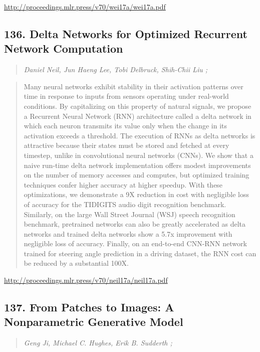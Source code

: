 \documentclass{article}
\begin{document}
\href{http://proceedings.mlr.press/v70/wei17a/wei17a.pdf}{http://proceedings.mlr.press/v70/wei17a/wei17a.pdf}

\subsection{136. Delta Networks for Optimized Recurrent Network Computation}

\begin{quote}
\footnotesize{\textit{Daniel Neil, Jun Haeng Lee, Tobi Delbruck, Shih-Chii Liu ;}}

\end{quote}

\begin{quote}
    Many neural networks exhibit stability in their activation patterns over time in response to inputs from sensors operating under real-world conditions. By capitalizing on this property of natural signals, we propose a Recurrent Neural Network (RNN) architecture called a delta network in which each neuron transmits its value only when the change in its activation exceeds a threshold. The execution of RNNs as delta networks is attractive because their states must be stored and fetched at every timestep, unlike in convolutional neural networks (CNNs). We show that a naive run-time delta network implementation offers modest improvements on the number of memory accesses and computes, but optimized training techniques confer higher accuracy at higher speedup. With these optimizations, we demonstrate a 9X reduction in cost with negligible loss of accuracy for the TIDIGITS audio digit recognition benchmark. Similarly, on the large Wall Street Journal (WSJ) speech recognition benchmark, pretrained networks can also be greatly accelerated as delta networks and trained delta networks show a 5.7x improvement with negligible loss of accuracy. Finally, on an end-to-end CNN-RNN network trained for steering angle prediction in a driving dataset, the RNN cost can be reduced by a substantial 100X.  
\end{quote}

\href{http://proceedings.mlr.press/v70/neil17a/neil17a.pdf}{http://proceedings.mlr.press/v70/neil17a/neil17a.pdf}

\subsection{137. From Patches to Images: A Nonparametric Generative Model}

\begin{quote}
\footnotesize{\textit{Geng Ji, Michael C. Hughes, Erik B. Sudderth ;}}

\end{quote}
\end{document}

